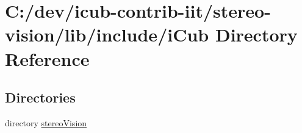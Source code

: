 \section{C\+:/dev/icub-\/contrib-\/iit/stereo-\/vision/lib/include/i\+Cub Directory Reference}
\label{dir_05906369c2d654c318c8e5f0b9121080}
\subsection*{Directories}
\begin{DoxyCompactItemize}
\item 
directory \hyperlink{dir_50bad1a883b2386a62f50ea4f4f2f861}{stereo\+Vision}
\end{DoxyCompactItemize}
